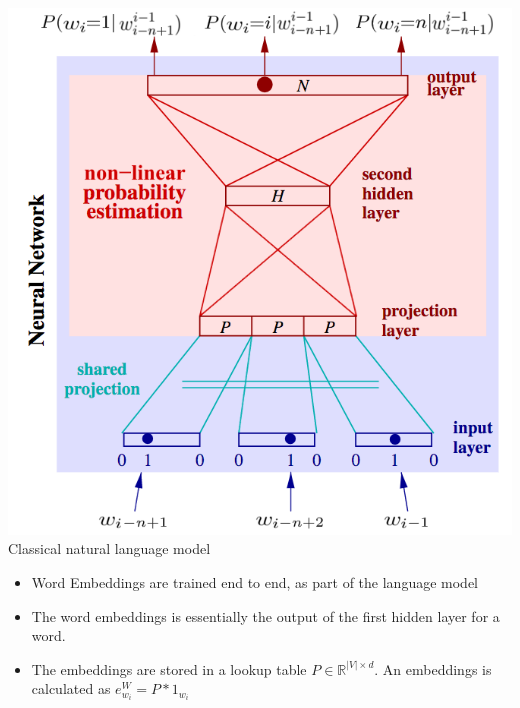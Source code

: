 \documentclass[11pt, a4paper, landscape]{article}
\begin{document}
\begin{minipage}[b]{.4\linewidth}
  \begin{center}
    \includegraphics[width=\linewidth]{../article/img/classic_nnlm}
    Classical natural language model
  \end{center}
\end{minipage}
\begin{minipage}[b]{.6\linewidth}
  \begin{itemize}
  \item Word Embeddings are trained end to end, as part of the language model
  \item The word embeddings is essentially the output of the first hidden layer for a word.
  \item The embeddings are stored in a lookup table $P \in \mathbb{R}^{|V| \times d}$. 
      An embeddings is calculated as $e_{w_i}^W = P * 1_{w_i}$
  \end{itemize}
\end{minipage}

\NewPage{}
\end{document}
